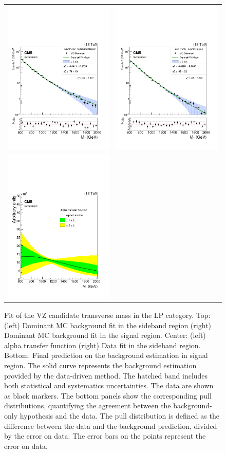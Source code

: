 \begin{figure}[!ht]
\caption{ Fit of the VZ candidate transverse mass in the LP category. Top: (left) Dominant MC background fit in the sideband region (right) Dominant MC background fit in the signal region. Center: (left) alpha transfer function (right) Data fit in the sideband region. Bottom: Final prediction on the background estimation in signal region.
The solid curve represents the background estimation provided by the data-driven
method. The hatched band includes both statistical and systematics uncertainties. The data
are shown as black markers. The bottom panels show the corresponding pull distributions,
quantifying the agreement between the background-only hypothesis and the data. The pull
distribution is defined as the difference between the data and the background prediction, divided by the error on data. The error bars on the points represent the error on data.}
\begin{tabular}{cc}
  \includegraphics[width=150pt]{figuresARC/fits/sbDom_MVZLP.pdf} &
  \includegraphics[width=150pt]{figuresARC/fits/sigDom_MVZLP.pdf}\\
\includegraphics[width=150pt]{figuresARC/fits/alphaLP.pdf}&

\end{tabular}
\end{figure}
